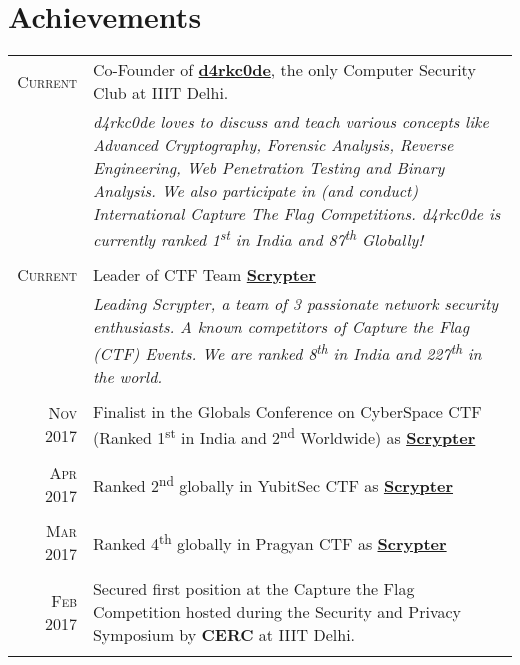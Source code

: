 \documentclass[a4paper,10pt]{article}
\begin{document}
\section{Achievements}
\begin{tabular}{r|p{13.7cm}}
\textsc{Current} & Co-Founder of \href{https://ctftime.org/team/15154}{\textbf{d4rkc0de}}, the only Computer Security Club at IIIT Delhi.  \\
& \emph{\small{d4rkc0de loves to discuss and teach various concepts like Advanced Cryptography, Forensic Analysis, Reverse Engineering, Web Penetration Testing and Binary Analysis. We also participate in (and conduct) International Capture The Flag Competitions. d4rkc0de is currently ranked 1\textsuperscript{st} in India and 87\textsuperscript{th} Globally!}}\\\multicolumn{2}{c}{}\\
\textsc{Current}& Leader of CTF Team \href{https://ctftime.org/team/31353}{\textbf{Scrypter}} \\
& \emph{\small{Leading Scrypter, a team of 3 passionate network security enthusiasts. A known competitors of Capture the Flag (CTF) Events. We are ranked 8\textsuperscript{th} in India and 227\textsuperscript{th} in the world. }}\\\multicolumn{2}{c}{}\\
 \textsc{Nov} 2017 & Finalist in the Globals Conference on CyberSpace CTF (Ranked 1\textsuperscript{st} in India and 2\textsuperscript{nd} Worldwide) as \href{https://ctftime.org/team/31353}{\textbf{Scrypter}}\\\multicolumn{2}{c}{}\\
\textsc{Apr} 2017 & Ranked 2\textsuperscript{nd} globally in YubitSec CTF as \href{https://ctftime.org/team/31353}{\textbf{Scrypter}}\\\multicolumn{2}{c}{}\\
\textsc{Mar} 2017 & Ranked 4\textsuperscript{th} globally in Pragyan CTF as \href{https://ctftime.org/team/31353}{\textbf{Scrypter}}\\\multicolumn{2}{c}{}\\
\textsc{Feb} 2017 & Secured first position at the Capture the Flag Competition hosted during the Security and Privacy Symposium by \textbf{CERC} at IIIT Delhi.\\\multicolumn{2}{c}{}\\

\end{tabular}
\end{document}
